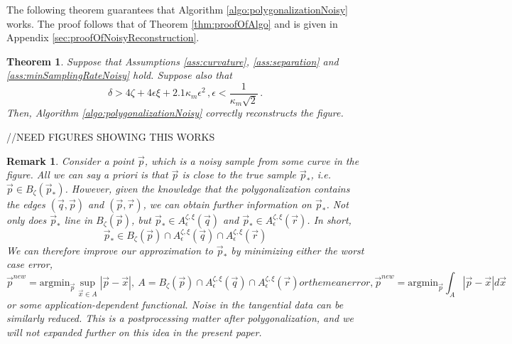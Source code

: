\documentclass{article}
\newtheorem{varremark}[cntr]{Remark}
\newenvironment{remark}{\begin{varremark}\em}{\em\end{varremark}}
\newtheorem{theorem}[cntr]{Theorem}
\numberwithin{cntr}{section}
\numberwithin{equation}{section}
\newcommand{\abs}[1]{\left| #1 \right|}%
\newcommand{\vx}[0]{{\vec{x}}}
\newcommand{\vp}[0]{{\vec{p}}}
\newcommand{\vq}[0]{{\vec{q}}}
\newcommand{\vr}[0]{{\vec{r}}}
\newcommand{\ball}[2]{ { B_{#1}(#2) } }
\newcommand{\curvemax}{{\kappa_{m}}}
\newcommand{\curvesep}{{\delta}}
\newcommand{\pointNoise}{{\zeta}}
\newcommand{\tanNoise}{{\xi}}
\newcommand{\nallowed}[2]{ { A^{\pointNoise, \tanNoise}_{#1}(#2) } }
\begin{document}
The following theorem
guarantees that Algorithm \ref{algo:polygonalizationNoisy} works.
The proof follows that of Theorem \ref{thm:proofOfAlgo}
and is given in Appendix \ref{sec:proofOfNoisyReconstruction}.

\begin{theorem}
  \label{thm:noisyReconstruction}
  Suppose that Assumptions \ref{ass:curvature}, \ref{ass:separation} and \ref{ass:minSamplingRateNoisy} hold. Suppose also that
  \begin{subequations}
    \label{eq:noisySeparationConditions}
    \begin{equation}
      \label{eq:noisySeparationDistance}
      \curvesep > 4 \pointNoise + 4 \epsilon \tanNoise + 2.1 \curvemax \epsilon^{2} \, ,
    \end{equation}
    \begin{equation}
      \label{eq:noisyConstraintOnkmaxEpsilon}
      \epsilon < \frac{1}{ \curvemax \sqrt{2}} \, .
    \end{equation}
  \end{subequations}
  Then, Algorithm \ref{algo:polygonalizationNoisy} correctly reconstructs
the figure.
\end{theorem}

//NEED FIGURES SHOWING THIS WORKS

\begin{remark}
Consider a point $\vp$, which is a noisy sample from some curve in the figure.
All we can say a priori is that $\vp$ is close to the true
sample $\vp_{\ast}$, i.e. $\vp \in \ball{\pointNoise}{\vp_{\ast}}$.
However, given the knowledge that the polygonalization contains
the edges $(\vq,\vp)$ and $(\vp,\vr)$, we can obtain further information
on $\vp_{\ast}$. Not only does $\vp_{\ast}$ line in $\ball{\pointNoise}{\vp}$,
but $\vp_{\ast} \in \nallowed{\epsilon}{\vq}$ and
$\vp_{\ast} \in \nallowed{\epsilon}{\vr}$. In short,
\begin{equation}
  \label{eq:noisyFilteringFromAllowedRegions}
  \vp_{\ast} \in \ball{\pointNoise}{\vp} \cap \nallowed{\epsilon}{\vq} \cap  \nallowed{\epsilon}{\vr}
\end{equation}
We can therefore improve our approximation to $\vp_{\ast}$ by minimizing
either the worst case error,
\begin{subequations}
  \begin{equation}
    \vp^{new} = \textrm{argmin}_{\vp}  \sup_{\vx \in A} \abs{\vp - \vx}, ~ A = \ball{\pointNoise}{\vp} \cap \nallowed{\epsilon}{\vq} \cap  \nallowed{\epsilon}{\vr}
  \end{equation}
  or the mean error,
  \begin{equation}
    \vp^{new} = \textrm{argmin}_{\vp}  \int_{A} \abs{\vp - \vx} d\vx
  \end{equation}
\end{subequations}
or some application-dependent functional.
Noise in the tangential data can be similarly reduced.
This is a postprocessing matter after polygonalization,
and we will not expanded further on this idea in the present paper.
\end{remark}
\end{document}
